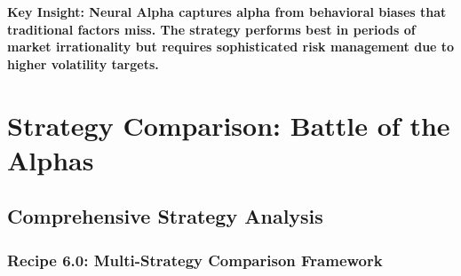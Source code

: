 \documentclass[11pt,letterpaper,openany]{book}
\begin{document}
\textbf{Key Insight: Neural Alpha captures alpha from behavioral biases that traditional factors miss. The strategy performs best in periods of market irrationality but requires sophisticated risk management due to higher volatility targets.}

\chapter{Strategy Comparison: Battle of the Alphas}

\section{Comprehensive Strategy Analysis}

\subsection{Recipe 6.0: Multi-Strategy Comparison Framework}
\end{document}
